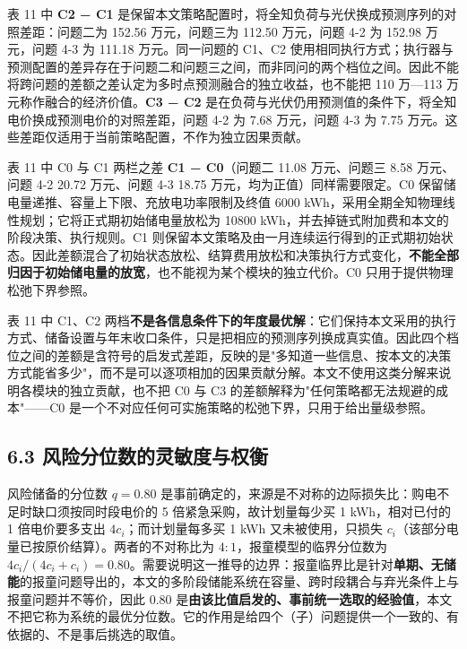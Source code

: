 \documentclass[12pt,a4paper]{ctexart}
\begin{document}
表 11 中 \textbf{C2 − C1} 是保留本文策略配置时，将全知负荷与光伏换成预测序列的对照差距：问题二为 152.56 万元，问题三为 112.50 万元，问题 4-2 为 152.98 万元，问题 4-3 为 111.18 万元。同一问题的 C1、C2 使用相同执行方式；执行器与预测配置的差异存在于问题二和问题三之间，而非同问的两个档位之间。因此不能将跨问题的差额之差认定为多时点预测融合的独立收益，也不能把 110 万—113 万元称作融合的经济价值。\textbf{C3 − C2} 是在负荷与光伏仍用预测值的条件下，将全知电价换成预测电价的对照差距，问题 4-2 为 7.68 万元，问题 4-3 为 7.75 万元。这些差距仅适用于当前策略配置，不作为独立因果贡献。

表 11 中 C0 与 C1 两栏之差 \textbf{C1 − C0}（问题二 11.08 万元、问题三 8.58 万元、问题 4-2 20.72 万元、问题 4-3 18.75 万元，均为正值）同样需要限定。C0 保留储电量递推、容量上下限、充放电功率限制及终值 6000 kWh，采用全期全知物理线性规划；它将正式期初始储电量放松为 10800 kWh，并去掉链式附加费和本文的阶段决策、执行规则。C1 则保留本文策略及由一月连续运行得到的正式期初始状态。因此差额混合了初始状态放松、结算费用放松和决策执行方式变化，\textbf{不能全部归因于初始储电量的放宽}，也不能视为某个模块的独立代价。C0 只用于提供物理松弛下界参照。

表 11 中 C1、C2 两档\textbf{不是各信息条件下的年度最优解}：它们保持本文采用的执行方式、储备设置与年末收口条件，只是把相应的预测序列换成真实值。因此四个档位之间的差额是含符号的启发式差距，反映的是"多知道一些信息、按本文的决策方式能省多少"，而不是可以逐项相加的因果贡献分解。本文不使用这类分解来说明各模块的独立贡献，也不把 C0 与 C3 的差额解释为"任何策略都无法规避的成本"——C0 是一个不对应任何可实施策略的松弛下界，只用于给出量级参照。

\subsection*{6.3 风险分位数的灵敏度与权衡}

风险储备的分位数 $q=0.80$ 是事前确定的，来源是不对称的边际损失比：购电不足时缺口须按同时段电价的 5 倍紧急采购，故计划量每少买 1 kWh，相对已付的 1 倍电价要多支出 $4c_i$；而计划量每多买 1 kWh 又未被使用，只损失 $c_i$（该部分电量已按原价结算）。两者的不对称比为 $4:1$，报童模型的临界分位数为 $4c_i/(4c_i+c_i)=0.80$。需要说明这一推导的边界：报童临界比是针对\textbf{单期、无储能}的报童问题导出的，本文的多阶段储能系统在容量、跨时段耦合与弃光条件上与报童问题并不等价，因此 0.80 是\textbf{由该比值启发的、事前统一选取的经验值}，本文不把它称为系统的最优分位数。它的作用是给四个（子）问题提供一个一致的、有依据的、不是事后挑选的取值。
\end{document}
